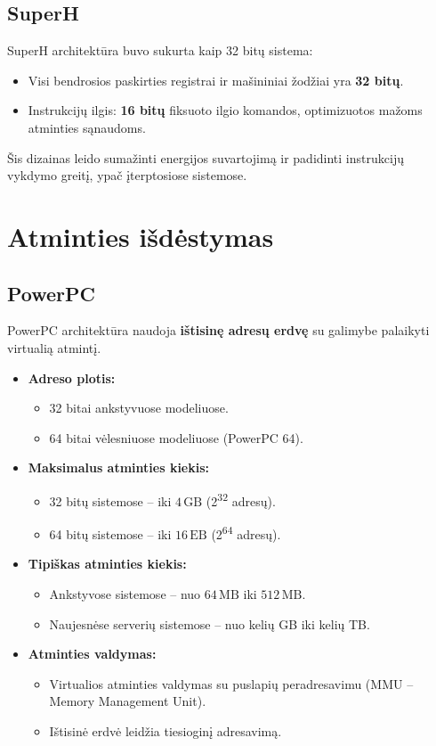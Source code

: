\documentclass{article}
\begin{document}
\subsection{SuperH}
SuperH architektūra buvo sukurta kaip 32 bitų sistema:
\begin{itemize}
    \item Visi bendrosios paskirties registrai ir mašininiai žodžiai yra \textbf{32 bitų}.
    \item Instrukcijų ilgis: \textbf{16 bitų} fiksuoto ilgio komandos, optimizuotos mažoms atminties sąnaudoms.
\end{itemize}
Šis dizainas leido sumažinti energijos suvartojimą ir padidinti instrukcijų vykdymo greitį, ypač įterptosiose sistemose.

\section{Atminties išdėstymas}
\subsection{PowerPC}
PowerPC architektūra naudoja \textbf{ištisinę adresų erdvę} su galimybe palaikyti virtualią atmintį. 

\begin{itemize}
    \item \textbf{Adreso plotis:} 
        \begin{itemize}
            \item 32 bitai ankstyvuose modeliuose.
            \item 64 bitai vėlesniuose modeliuose (PowerPC 64).
        \end{itemize}
    \item \textbf{Maksimalus atminties kiekis:}
        \begin{itemize}
            \item 32 bitų sistemose – iki \( 4 \, \text{GB} \) (2\textsuperscript{32} adresų).
            \item 64 bitų sistemose – iki \( 16 \, \text{EB} \) (2\textsuperscript{64} adresų).
        \end{itemize}
    \item \textbf{Tipiškas atminties kiekis:}
        \begin{itemize}
            \item Ankstyvose sistemose – nuo \( 64 \, \text{MB} \) iki \( 512 \, \text{MB} \).
            \item Naujesnėse serverių sistemose – nuo kelių GB iki kelių TB.
        \end{itemize}
    \item \textbf{Atminties valdymas:}
        \begin{itemize}
            \item Virtualios atminties valdymas su puslapių peradresavimu (MMU – Memory Management Unit).
            \item Ištisinė erdvė leidžia tiesioginį adresavimą.
        \end{itemize}
\end{itemize}
\end{document}
